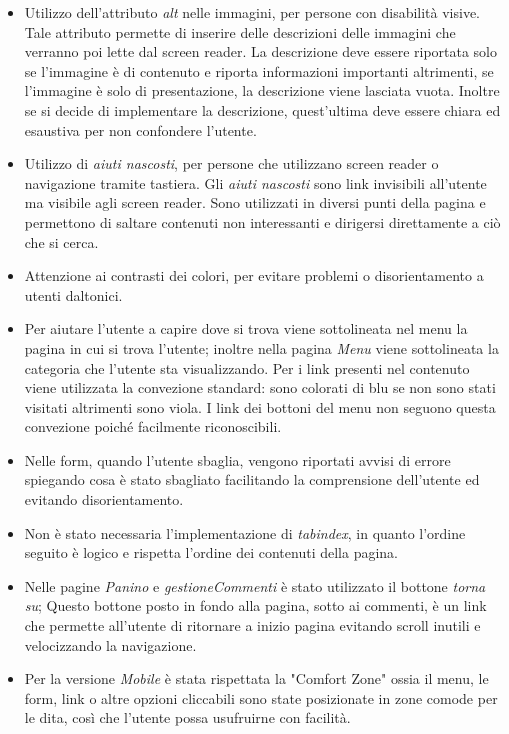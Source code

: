 	\begin{itemize}
		\item Utilizzo dell'attributo \emph{alt} nelle immagini, per persone con disabilità visive.
		 Tale attributo permette di inserire delle descrizioni delle immagini che verranno poi lette dal screen reader. 
		 La descrizione deve essere riportata solo se l'immagine è di contenuto e riporta informazioni importanti altrimenti, se l'immagine è solo di presentazione, la descrizione viene lasciata vuota.
		 Inoltre se si decide di implementare la descrizione, quest'ultima deve essere chiara ed esaustiva per non confondere l'utente.
		\item Utilizzo di \emph{aiuti nascosti}, per persone che utilizzano screen reader o navigazione tramite tastiera. 
		Gli \emph{aiuti nascosti} sono link invisibili all'utente ma visibile agli screen reader.
		 Sono utilizzati in diversi punti della pagina e permettono di saltare contenuti non interessanti e dirigersi direttamente a ciò che si cerca.
		\item Attenzione ai contrasti dei colori, per evitare problemi o disorientamento a utenti daltonici. 
		\item Per aiutare l'utente a capire dove si trova viene sottolineata nel menu la pagina in cui si trova l'utente; inoltre nella pagina \emph{Menu} viene sottolineata la categoria che l'utente sta visualizzando.
		Per i link presenti nel contenuto viene utilizzata la convezione standard: sono colorati di blu se non sono stati visitati altrimenti sono viola.
		I link dei bottoni del menu non seguono questa convezione poiché facilmente riconoscibili.
		\item Nelle form, quando l'utente sbaglia, vengono riportati avvisi di errore spiegando cosa è stato sbagliato facilitando la comprensione dell'utente ed evitando disorientamento.
		\item Non è stato necessaria l'implementazione di \emph{tabindex}, in quanto l'ordine seguito è logico e rispetta l'ordine dei contenuti della pagina. %
		\item Nelle pagine \emph{Panino} e \emph{gestioneCommenti} è stato utilizzato il bottone \emph{torna su}; Questo bottone posto in fondo alla pagina, sotto ai commenti, è un link che permette all'utente di ritornare a inizio pagina evitando scroll inutili e velocizzando la navigazione. 
		\item Per la versione \emph{Mobile} è stata rispettata la "Comfort Zone" ossia il menu, le form, link o altre opzioni cliccabili sono state posizionate in zone comode per le dita, così che l'utente possa usufruirne con facilità. 
	\end{itemize}